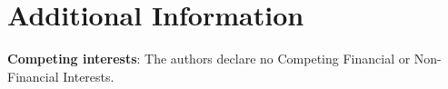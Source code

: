 \documentclass[prb,reprint,superscriptaddress]{revtex4-2}
\begin{document}
% 
%
\section*{Additional Information}

\textbf{Competing interests}: The authors declare no Competing Financial or 
Non-Financial Interests.

% 
%

\end{document}
